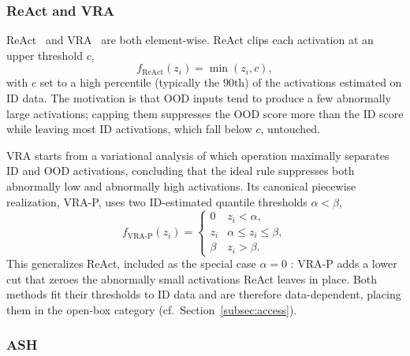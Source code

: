 \documentclass[a4paper]{article}
\begin{document}
\subsubsection{ReAct and VRA}
\label{subsec:react-vra}

ReAct~\citep{react} and VRA~\citep{vra} are both element-wise. ReAct clips each
activation at an upper threshold $c$,
\begin{equation}
f_{\mathrm{ReAct}}(z_i) = \min(z_i, c),
\end{equation}
with $c$ set to a high percentile (typically the $90$th) of the activations
estimated on ID data. The motivation is that OOD inputs tend to produce a few
abnormally large activations; capping them suppresses the OOD score more than the ID
score while leaving most ID activations, which fall below $c$, untouched.

VRA starts from a variational analysis of which operation maximally separates ID and
OOD activations, concluding that the ideal rule suppresses both abnormally low and
abnormally high activations. Its canonical piecewise realization, VRA-P, uses two
ID-estimated quantile thresholds $\alpha < \beta$,
\begin{equation}
f_{\mathrm{VRA\text{-}P}}(z_i) =
\begin{cases}
0 & z_i < \alpha, \\
z_i & \alpha \leq z_i \leq \beta, \\
\beta & z_i > \beta .
\end{cases}
\end{equation}
This generalizes ReAct, included as the special case $\alpha = 0$ \cite{vra}: VRA-P
adds a lower cut that zeroes the abnormally small activations ReAct leaves in place.
Both methods fit their thresholds to ID data and are therefore data-dependent,
placing them in the open-box category (cf.\ Section~\ref{subsec:access}).

\subsubsection{ASH}
\label{subsec:ash}
\end{document}
